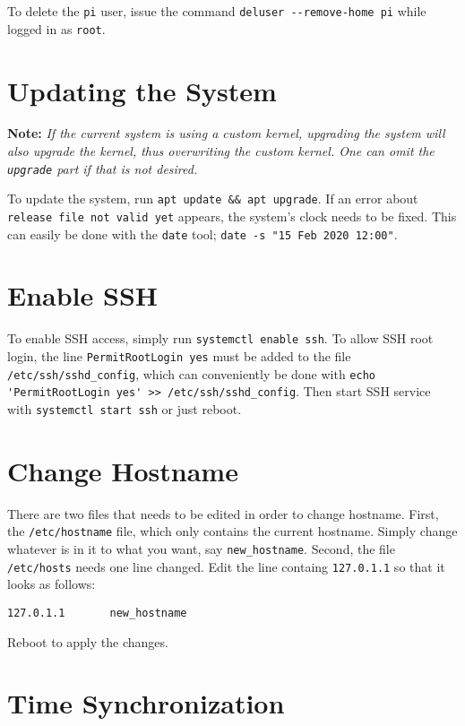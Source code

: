 To delete the \lstinline{pi} user, issue the command \lstinline{deluser --remove-home pi} while logged in as \lstinline{root}.


\section{Updating the System} \label{update_system}

\textbf{Note:} \textit{If the current system is using a custom kernel, upgrading the system will also upgrade the kernel, thus overwriting the custom kernel. One can omit the \lstinline{upgrade} part if that is not desired.}

To update the system, run \lstinline{apt update && apt upgrade}. If an error about \lstinline{release file not valid yet} appears, the system's clock needs to be fixed. This can easily be done with the \lstinline{date} tool; \lstinline{date -s "15 Feb 2020 12:00"}.


\section{Enable SSH} \label{enable_ssh}

To enable SSH access, simply run \lstinline{systemctl enable ssh}. To allow SSH root login, the line \lstinline{PermitRootLogin yes} must be added to the file \lstinline{/etc/ssh/sshd_config}, which can conveniently be done with \lstinline{echo 'PermitRootLogin yes' >> /etc/ssh/sshd_config}. Then start SSH service with \lstinline{systemctl start ssh} or just reboot.


\section{Change Hostname} \label{change_hostname}

There are two files that needs to be edited in order to change hostname. First, the \lstinline{/etc/hostname} file, which only contains the current hostname. Simply change whatever is in it to what you want, say \lstinline{new_hostname}. Second, the file \lstinline{/etc/hosts} needs one line changed. Edit the line containg \lstinline{127.0.1.1} so that it looks as follows:

\begin{lstlisting}
127.0.1.1       new_hostname
\end{lstlisting}

Reboot to apply the changes.


\section{Time Synchronization} \label{time_sync}

